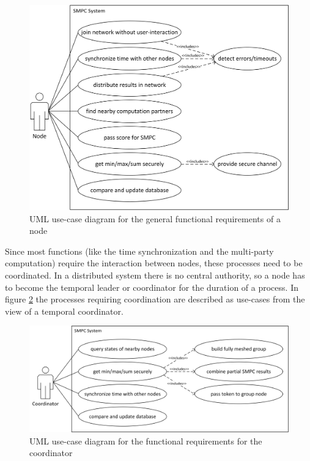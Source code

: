 \begin{figure}[!htb] %
	\caption{\gls{UML} use-case diagram for the general functional requirements of a node} \label{figure:requirements use-case node}
	\includegraphics[scale=0.85]{figures/use-case-node.png}
\end{figure}

Since most functions (like the time synchronization and the multi-party computation) require the interaction between nodes, these processes need to be coordinated. In a distributed system there is no central authority, so a node has to become the temporal leader or coordinator for the duration of a process. In figure \ref{figure:requirements use-case coordinator} the processes requiring coordination are described as use-cases from the view of a temporal coordinator.

\begin{figure}[!htb] %
	\caption{\gls{UML} use-case diagram for the functional requirements for the coordinator} \label{figure:requirements use-case coordinator}
	\includegraphics[scale=0.75]{figures/use-case-coordinator.png}
\end{figure}

